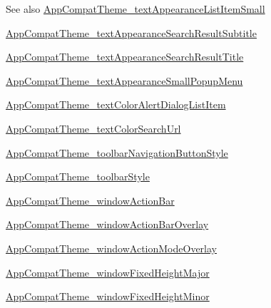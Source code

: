 \begin{DoxySeeAlso}{See also}
\hyperlink{classandroid_1_1support_1_1v7_1_1appcompat_1_1R_1_1styleable_a29f596f618045a5601a94a5dcc66946d}{App\+Compat\+Theme\+\_\+text\+Appearance\+List\+Item\+Small} 

\hyperlink{classandroid_1_1support_1_1v7_1_1appcompat_1_1R_1_1styleable_a797b49953c62db18a1dff0a607fc45b1}{App\+Compat\+Theme\+\_\+text\+Appearance\+Search\+Result\+Subtitle} 

\hyperlink{classandroid_1_1support_1_1v7_1_1appcompat_1_1R_1_1styleable_a9d65706b447bcd2a979584ec58b642f9}{App\+Compat\+Theme\+\_\+text\+Appearance\+Search\+Result\+Title} 

\hyperlink{classandroid_1_1support_1_1v7_1_1appcompat_1_1R_1_1styleable_a3954e911add56535f0dee6d29c451821}{App\+Compat\+Theme\+\_\+text\+Appearance\+Small\+Popup\+Menu} 

\hyperlink{classandroid_1_1support_1_1v7_1_1appcompat_1_1R_1_1styleable_a3c4e949776f711a5bd06b91184ceb404}{App\+Compat\+Theme\+\_\+text\+Color\+Alert\+Dialog\+List\+Item} 

\hyperlink{classandroid_1_1support_1_1v7_1_1appcompat_1_1R_1_1styleable_a2b9490f156d0cba539dc09a7aa3883e5}{App\+Compat\+Theme\+\_\+text\+Color\+Search\+Url} 

\hyperlink{classandroid_1_1support_1_1v7_1_1appcompat_1_1R_1_1styleable_ad578ce7888cd20c22c0f76c70ac3e899}{App\+Compat\+Theme\+\_\+toolbar\+Navigation\+Button\+Style} 

\hyperlink{classandroid_1_1support_1_1v7_1_1appcompat_1_1R_1_1styleable_a1e7ba103613221a76d37b259fde162e4}{App\+Compat\+Theme\+\_\+toolbar\+Style} 

\hyperlink{classandroid_1_1support_1_1v7_1_1appcompat_1_1R_1_1styleable_a9ed69fb61097add24dccaf9f82bbd746}{App\+Compat\+Theme\+\_\+window\+Action\+Bar} 

\hyperlink{classandroid_1_1support_1_1v7_1_1appcompat_1_1R_1_1styleable_aabf99bfa0bdf029240c1024f81c0475d}{App\+Compat\+Theme\+\_\+window\+Action\+Bar\+Overlay} 

\hyperlink{classandroid_1_1support_1_1v7_1_1appcompat_1_1R_1_1styleable_a68fc3502f128d8ccc5f6cb4fe4662317}{App\+Compat\+Theme\+\_\+window\+Action\+Mode\+Overlay} 

\hyperlink{classandroid_1_1support_1_1v7_1_1appcompat_1_1R_1_1styleable_ad39d6f1f8f5f5276ffcd26e8ba52a62a}{App\+Compat\+Theme\+\_\+window\+Fixed\+Height\+Major} 

\hyperlink{classandroid_1_1support_1_1v7_1_1appcompat_1_1R_1_1styleable_a5ea54cdfaf428b78c942f5de400a165f}{App\+Compat\+Theme\+\_\+window\+Fixed\+Height\+Minor} 


\end{DoxySeeAlso}
